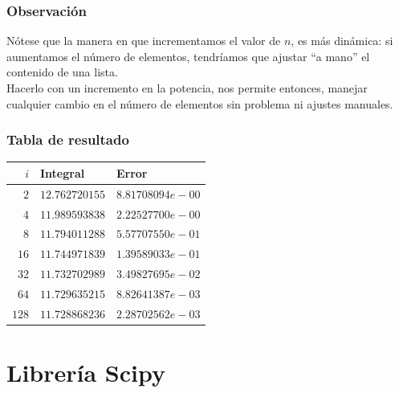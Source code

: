 \begin{frame}
\frametitle{Observación}
Nótese que la manera en que incrementamos el valor de $n$, es más dinámica: si aumentamos el número de elementos, tendríamos que ajustar \enquote{a mano} el contenido de una lista.
\\
\bigskip
Hacerlo con un incremento en la potencia, nos permite entonces, manejar cualquier cambio en el número de elementos sin problema ni ajustes manuales.
\end{frame}
\begin{frame}
\frametitle{Tabla de resultado}
\fontsize{12}{12}\selectfont
\begin{center}
\begin{tabular}{r | l | l} 
$i$ & Integral & Error \\ \hline
$2$ & $12.762720155$ & $8.81708094e-00$ \\ \hline
$4$ & $11.989593838$ & $2.22527700e-00$ \\ \hline
$8$ & $11.794011288$ & $5.57707550e-01$ \\ \hline
$16$ & $11.744971839$ & $1.39589033e-01$ \\ \hline
$32$ & $11.732702989$ & $3.49827695e-02$ \\ \hline
$64$ & $11.729635215$ & $8.82641387e-03$ \\ \hline
$128$ & $11.728868236$ & $2.28702562e-03$
\end{tabular}
\end{center}
\end{frame}
\section{Librería Scipy}
